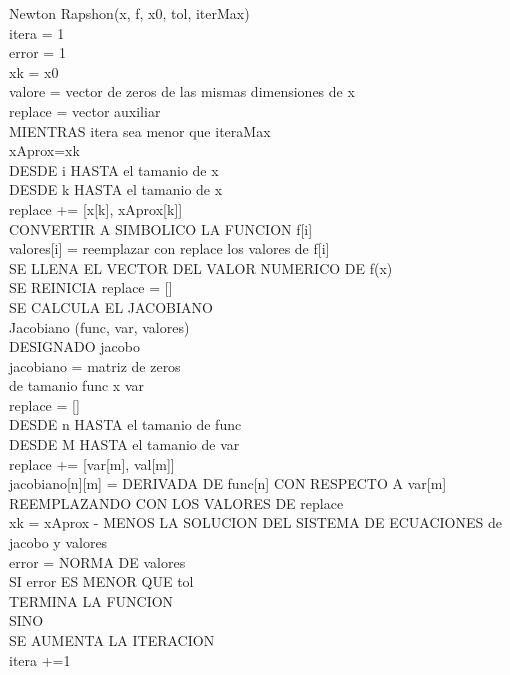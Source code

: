 \documentclass[journal]{IEEEtran}
\begin{document}
Newton Rapshon(x, f, x0, tol, iterMax)\\
\indent itera = 1\\
\indent error = 1\\
\indent xk = x0\\
\indent valore = vector de zeros de las mismas dimensiones de x\\
\indent replace = vector auxiliar\\
\indent MIENTRAS itera sea menor que iteraMax\\
\indent \indent xAprox=xk\\
\indent \indent DESDE i HASTA el tamanio de x\\
\indent \indent \indent DESDE k HASTA el tamanio de x\\
\indent \indent \indent \indent replace += [x[k], xAprox[k]]\\
\indent \indent \indent CONVERTIR A SIMBOLICO LA FUNCION f[i]\\
\indent \indent \indent \indent	valores[i] = reemplazar con replace los valores de f[i]\\
\indent \indent \indent \indent	SE LLENA EL VECTOR DEL VALOR NUMERICO DE f(x)\\
\indent \indent \indent \indent SE REINICIA replace = []\\
\indent \indent \indent \indent SE CALCULA EL JACOBIANO\\
\indent \indent \indent \indent \indent Jacobiano (func, var, valores)\\   \indent \indent \indent \indent \indent DESIGNADO jacobo\\
\indent \indent \indent \indent \indent \indent jacobiano = matriz de zeros\\ \indent \indent \indent \indent \indent \indent de tamanio func x var\\
\indent \indent \indent \indent \indent \indent replace = []\\
\indent \indent \indent \indent \indent \indent DESDE n HASTA el tamanio de func\\
\indent \indent \indent \indent \indent \indent \indent DESDE M HASTA el tamanio de var\\
\indent \indent \indent \indent \indent \indent \indent \indent replace += [var[m], val[m]]\\
\indent \indent \indent \indent \indent \indent \indent jacobiano[n][m] = DERIVADA DE func[n] CON RESPECTO A var[m] REEMPLAZANDO CON LOS VALORES DE replace\\
\indent \indent \indent \indent xk = xAprox - MENOS LA SOLUCION DEL SISTEMA DE ECUACIONES de jacobo y valores\\
\indent \indent \indent \indent error = NORMA DE valores\\
\indent \indent \indent \indent SI error ES MENOR QUE tol\\
\indent \indent \indent \indent \indent TERMINA LA FUNCION\\
\indent \indent \indent \indent SINO \\
\indent \indent \indent \indent \indent SE AUMENTA LA ITERACION\\
\indent \indent \indent \indent \indent itera +=1\\
\end{document}
